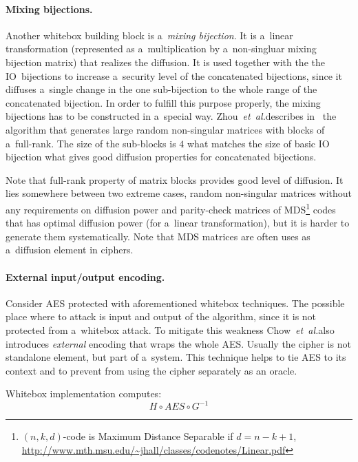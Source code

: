 \documentclass[11pt,oneside,final]{fithesis2}
\newcommand{\eal}{\emph{et~al.}}
\begin{document}
    \paragraph*{Mixing bijections.}
    Another whitebox building block is a~\emph{mixing bijection}. It is a~linear transformation (represented as a~multiplication by a~non-singluar mixing bijection matrix)
    that realizes the diffusion. It is used together with the the IO~bijections to increase a~security level of the concatenated bijections, since it diffuses a~single change
    in the one sub-bijection to the whole range of the concatenated bijection. In order to fulfill this purpose properly, the mixing bijections has to be constructed
    in a~special way. Zhou~\eal describes in~\citep{journals/iacr/XiaoZ02} the algorithm that generates large random non-singular matrices with blocks of a~full-rank.
    The size of the sub-blocks is $4$ what matches the size of basic IO bijection what gives good diffusion properties for concatenated bijections. 
    
    Note that full-rank property of matrix blocks provides good level of diffusion. It lies somewhere between two extreme cases, random non-singular matrices without any
    requirements on diffusion power and parity-check matrices of MDS\footnote{$(n, k, d)$-code is Maximum Distance Separable if $d=n-k+1$, \url{http://www.mth.msu.edu/~jhall/classes/codenotes/Linear.pdf}} 
    codes that has optimal diffusion power (for a~linear transformation), but it is harder to generate them systematically. Note that MDS matrices are often uses 
    as a~diffusion element in ciphers.
    
    \paragraph*{External input/output encoding.}
    Consider AES protected with aforementioned whitebox techniques. The possible place where to attack is input and output of the algorithm, since it is not protected 
    from a~whitebox attack. To mitigate this weakness Chow~\eal also introduces \emph{external} encoding that wraps the whole AES. Usually the cipher is not standalone element,
    but part of a~system. This technique helps to tie AES to its context and to prevent from using the cipher separately as an oracle.

    Whitebox implementation computes:
    \begin{equation}
	H \circ AES \circ G^{-1}
    \end{equation}
    
\end{document}
